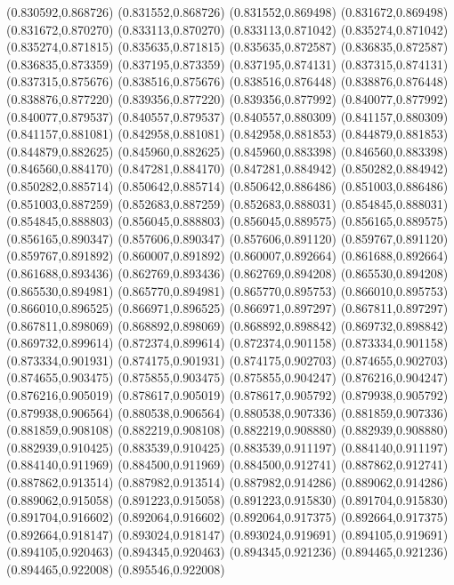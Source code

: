 (0.830592,0.868726)
(0.831552,0.868726)
(0.831552,0.869498)
(0.831672,0.869498)
(0.831672,0.870270)
(0.833113,0.870270)
(0.833113,0.871042)
(0.835274,0.871042)
(0.835274,0.871815)
(0.835635,0.871815)
(0.835635,0.872587)
(0.836835,0.872587)
(0.836835,0.873359)
(0.837195,0.873359)
(0.837195,0.874131)
(0.837315,0.874131)
(0.837315,0.875676)
(0.838516,0.875676)
(0.838516,0.876448)
(0.838876,0.876448)
(0.838876,0.877220)
(0.839356,0.877220)
(0.839356,0.877992)
(0.840077,0.877992)
(0.840077,0.879537)
(0.840557,0.879537)
(0.840557,0.880309)
(0.841157,0.880309)
(0.841157,0.881081)
(0.842958,0.881081)
(0.842958,0.881853)
(0.844879,0.881853)
(0.844879,0.882625)
(0.845960,0.882625)
(0.845960,0.883398)
(0.846560,0.883398)
(0.846560,0.884170)
(0.847281,0.884170)
(0.847281,0.884942)
(0.850282,0.884942)
(0.850282,0.885714)
(0.850642,0.885714)
(0.850642,0.886486)
(0.851003,0.886486)
(0.851003,0.887259)
(0.852683,0.887259)
(0.852683,0.888031)
(0.854845,0.888031)
(0.854845,0.888803)
(0.856045,0.888803)
(0.856045,0.889575)
(0.856165,0.889575)
(0.856165,0.890347)
(0.857606,0.890347)
(0.857606,0.891120)
(0.859767,0.891120)
(0.859767,0.891892)
(0.860007,0.891892)
(0.860007,0.892664)
(0.861688,0.892664)
(0.861688,0.893436)
(0.862769,0.893436)
(0.862769,0.894208)
(0.865530,0.894208)
(0.865530,0.894981)
(0.865770,0.894981)
(0.865770,0.895753)
(0.866010,0.895753)
(0.866010,0.896525)
(0.866971,0.896525)
(0.866971,0.897297)
(0.867811,0.897297)
(0.867811,0.898069)
(0.868892,0.898069)
(0.868892,0.898842)
(0.869732,0.898842)
(0.869732,0.899614)
(0.872374,0.899614)
(0.872374,0.901158)
(0.873334,0.901158)
(0.873334,0.901931)
(0.874175,0.901931)
(0.874175,0.902703)
(0.874655,0.902703)
(0.874655,0.903475)
(0.875855,0.903475)
(0.875855,0.904247)
(0.876216,0.904247)
(0.876216,0.905019)
(0.878617,0.905019)
(0.878617,0.905792)
(0.879938,0.905792)
(0.879938,0.906564)
(0.880538,0.906564)
(0.880538,0.907336)
(0.881859,0.907336)
(0.881859,0.908108)
(0.882219,0.908108)
(0.882219,0.908880)
(0.882939,0.908880)
(0.882939,0.910425)
(0.883539,0.910425)
(0.883539,0.911197)
(0.884140,0.911197)
(0.884140,0.911969)
(0.884500,0.911969)
(0.884500,0.912741)
(0.887862,0.912741)
(0.887862,0.913514)
(0.887982,0.913514)
(0.887982,0.914286)
(0.889062,0.914286)
(0.889062,0.915058)
(0.891223,0.915058)
(0.891223,0.915830)
(0.891704,0.915830)
(0.891704,0.916602)
(0.892064,0.916602)
(0.892064,0.917375)
(0.892664,0.917375)
(0.892664,0.918147)
(0.893024,0.918147)
(0.893024,0.919691)
(0.894105,0.919691)
(0.894105,0.920463)
(0.894345,0.920463)
(0.894345,0.921236)
(0.894465,0.921236)
(0.894465,0.922008)
(0.895546,0.922008)
